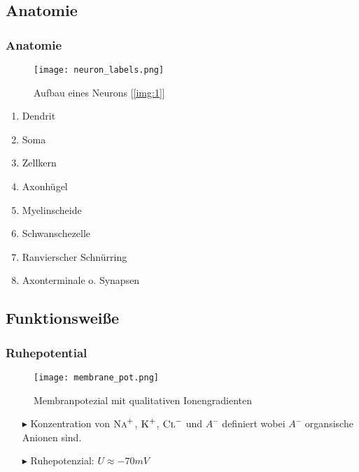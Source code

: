 \documentclass[ngerman]{beamer}
\begin{document}
\subsection{Anatomie}
\begin{frame}\frametitle{Anatomie }
\begin{multicols}{2} 
\begin{figure}[h]
	\texttt{[image: neuron\_labels.png]}
	\caption{Aufbau eines Neurons [\ref{img:1}]}
\end{figure}

\columnbreak
\hspace*{1cm}
\begin{enumerate}[a:, leftmargin=1.2cm]
	\item<1-> Dendrit
	\item<2-> Soma
	\item<3-> Zellkern
	\item<4-> Axonhügel
	\item<5-> Myelinscheide
	\item<6-> Schwanschezelle
	\item<7-> Ranvierscher Schnürring
	\item<8-> Axonterminale o. Synapsen
\end{enumerate}
\end{multicols} 

\end{frame}

\subsection{Funktionsweiße}
\begin{frame}\frametitle{ Ruhepotential }
\begin{multicols}{2}
\begin{figure}[h]
	\texttt{[image: membrane\_pot.png]}
	\caption{Membranpotezial mit qualitativen Ionengradienten}
\end{figure}

\columnbreak

\begin{itemize}
	\item[$\blacktriangleright$] Konzentration von $ \textsc{Na}^{+} $, $ \textsc{K}^{+} $, $ \textsc{Cl}^{-} $ und $ A^{-} $ definiert wobei $ A^{-} $ organsische Anionen sind.
	\item[$\blacktriangleright$] Ruhepotenzial: $U \approx -70 \textit{mV}$ 
\end{itemize}
\end{multicols}
\end{frame}
\end{document}
